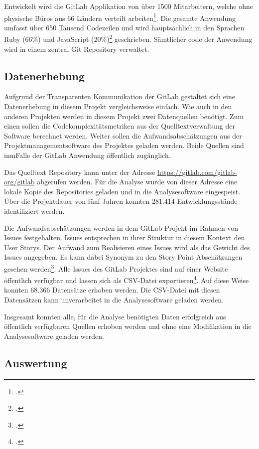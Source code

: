 Entwickelt wird die GitLab Applikation von über 1500 Mitarbeitern,
welche ohne physische Büros aus 66 Ländern verteilt arbeiten\footcite[Vgl. ][]{GitLabGitLab}.
Die gesamte Anwendung umfasst über 650 Tausend Codezeilen und wird hauptsächlich in den Sprachen Ruby (66\%) und
JavaScript (20\%)\footcite[Vgl. ][]{GitLabOrgGitLab} geschrieben. Sämtlicher code
der Anwendung wird in einem zentral Git Repository verwaltet.

\subsection{Datenerhebung}\label{gitlab-Datenerhebung}

Aufgrund der Transparenten Kommunikation der GitLab gestaltet sich eine
Datenerhebung in diesem Projekt vergleichsweise einfach. Wie auch in den
anderen Projekten werden in diesem Projekt zwei Datenquellen benötigt.
Zum einen sollen die Codekomplexitätsmetriken aus der
Quelltextverwaltung der Software berechnet werden. Weiter sollen die
Aufwandsabschätzungen aus der Projektmanagementsoftware des Projektes
geladen werden. Beide Quellen sind inmFalle der GitLab Anwendung
öffentlich zugänglich.

Das Quelltext Repository kann unter der Adresse
\url{https://gitlab.com/gitlab-org/gitlab} abgerufen werden. Für die
Analyse wurde von dieser Adresse eine lokale Kopie des Repositories
geladen und in die Analysesoftware eingespeist. Über die Projektdauer
von fünf Jahren konnten 281.414 Entwicklungsstände identifiziert werden.

Die Aufwandsabschätzungen werden in dem GitLab Projekt im Rahmen von
Issues festgehalten. Issues entsprechen in ihrer Struktur in diesem
Kontext den User Storys. Der Aufwand zum Realisieren eines Issues wird
als das Gewicht des Issues angegeben. Es kann dabei Synonym zu den Story
Point Abschätzungen gesehen werden\footcite[Vgl. ][]{ScaledAgileGitLab}. Alle
Issues des GitLab Projektes sind auf einer Website öffentlich verfügbar
und lassen sich als \ac{CSV}-Datei exportieren\footcite[Vgl. ][]{IssuesGitLabOrg}. Auf
diese Weise konnten 68.366 Datensätze erhoben werden. Die \ac{CSV}-Datei mit
diesen Datensätzen kann unverarbeitet in die Analysesoftware geladen
werden.

Insgesamt konnten alle, für die Analyse benötigten Daten erfolgreich aus
öffentlich verfügbaren Quellen erhoben werden und ohne eine Modifikation
in die Analysesoftware geladen werden.

\subsection{Auswertung}\label{gitlab-Auswertung}

